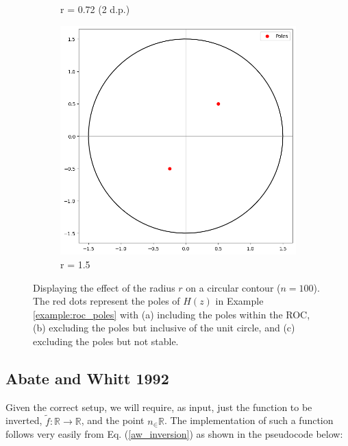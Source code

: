 \documentclass[a4paper]{report}
\begin{document}
\begin{figure}[H]
\begin{subfigure}{.25\linewidth}
      \caption{r = 0.72 (2 d.p.)}
      \label{fig:valid_r}
    \end{subfigure}\hfill
    \begin{subfigure}{.25\linewidth}
      \includegraphics[width=\linewidth]{images/unstable_contour.png}
      \caption{r = 1.5}
    \end{subfigure}\hfill
    
    \caption{ Displaying the effect of the radius $r$ on a circular contour ($n = 100$). The red dots represent the poles of $H(z)$ in Example \ref{example:roc_poles} with (a) including the poles within the ROC, (b) excluding the poles but inclusive of the unit circle, and (c) excluding the poles but not stable.}
    \label{fig:effect_r}
\end{figure}

\subsection{Abate and Whitt 1992}
Given the correct setup, we will require, as input,  just the function to be inverted, $\tilde{f}: \mathbb{R}\rightarrow \mathbb{R}$, and the point $n_\in \mathbb{R}$. The implementation of such a function follows very easily from Eq. (\ref{aw_inversion}) as shown in the pseudocode below:
\end{document}
